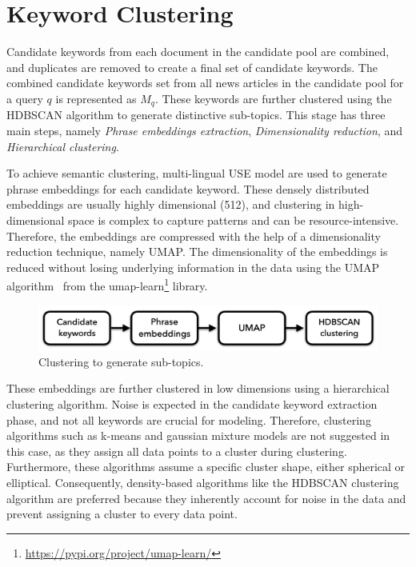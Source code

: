 \section{Keyword Clustering}

Candidate keywords from each document in the candidate pool are combined, and duplicates are removed to create a final set of candidate keywords. The combined candidate keywords set from all news articles in the candidate pool for a query $q$ is represented as $M_q$. These keywords are further clustered using the \ac{HDBSCAN} algorithm to generate distinctive sub-topics. This stage has three main steps, namely \emph{Phrase embeddings extraction}, \emph{Dimensionality reduction}, and \emph{Hierarchical clustering}. 

To achieve semantic clustering, multi-lingual \ac{USE} model are used to generate phrase embeddings for each candidate keyword. These densely distributed embeddings are usually highly dimensional (512), and clustering in high-dimensional space is complex to capture patterns and can be resource-intensive. Therefore, the embeddings are compressed with the help of a dimensionality reduction technique, namely \ac{UMAP}. The dimensionality of the embeddings is reduced without losing underlying information in the data using the \ac{UMAP} algorithm~\cite{mcinnes2018umap} from the umap-learn\footnote{\url{https://pypi.org/project/umap-learn/}} library.

\begin{figure}[h]
	\centering
	\includegraphics[width=.9\textwidth]{images/thesis_images/clustering.png}
	\caption{Clustering to generate sub-topics.  \label{fig:clustering}}
\end{figure}

 
These embeddings are further clustered in low dimensions using a hierarchical clustering algorithm. Noise is expected in the candidate keyword extraction phase, and not all keywords are crucial for modeling. Therefore, clustering algorithms such as k-means and gaussian mixture models are not suggested in this case, as they assign all data points to a cluster during clustering. Furthermore, these algorithms assume a specific cluster shape, either spherical or elliptical. Consequently, density-based algorithms like the \ac{HDBSCAN} clustering algorithm are preferred because they inherently account for noise in the data and prevent assigning a cluster to every data point.

